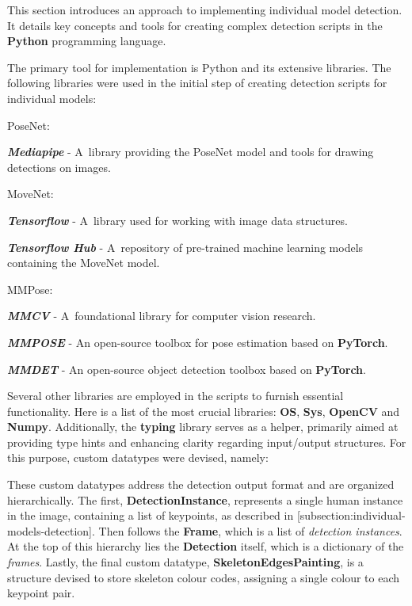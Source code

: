 This section introduces an approach to implementing individual model detection. It details key concepts and tools for creating complex detection scripts in the {\bf Python} programming language.

The primary tool for implementation is Python and its extensive libraries. The following libraries were used in the initial step of creating detection scripts for individual models:

\startitemize[n]
    \item PoseNet:
        \startitemize[1]
            \item {\bf {\em Mediapipe}} - A~library providing the PoseNet model and tools for drawing detections on images.
        \stopitemize
    \item MoveNet:
        \startitemize[1]
            \item {\bf {\em Tensorflow}} - A~library used for working with image data structures.
            \item {\bf {\em Tensorflow Hub}} - A~repository of pre-trained machine learning models containing the MoveNet model.
        \stopitemize
    \item MMPose:
        \startitemize[1]
            \item {\bf {\em MMCV}} - A~foundational library for computer vision research.
            \item {\bf {\em MMPOSE}} - An open-source toolbox for pose estimation based on {\bf PyTorch}.
            \item {\bf {\em MMDET}} - An open-source object detection toolbox based on {\bf PyTorch}.
        \stopitemize
\stopitemize

Several other libraries are employed in the scripts to furnish essential functionality. Here is a list of the most crucial libraries: {\bf OS}, {\bf Sys}, {\bf OpenCV} and {\bf Numpy}. Additionally, the {\bf typing} library serves as a helper, primarily aimed at providing type hints and enhancing clarity regarding input/output structures. For this purpose, custom datatypes were devised, namely:


These custom datatypes address the detection output format and are organized hierarchically. The first, {\bf DetectionInstance}, represents a single human instance in the image, containing a list of keypoints, as described in [subsection:individual-models-detection]. Then follows the {\bf Frame}, which is a list of {\em detection instances}. At the top of this hierarchy lies the {\bf Detection} itself, which is a dictionary of the {\em frames}. Lastly, the final custom datatype, {\bf SkeletonEdgesPainting}, is a structure devised to store skeleton colour codes, assigning a single colour to each keypoint pair.


